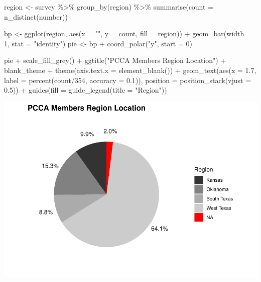 \documentclass[
]{article}
\newenvironment{Shaded}{\begin{snugshade}}{\end{snugshade}}
\newcommand{\AttributeTok}[1]{\textcolor[rgb]{0.77,0.63,0.00}{#1}}
\newcommand{\DecValTok}[1]{\textcolor[rgb]{0.00,0.00,0.81}{#1}}
\newcommand{\FloatTok}[1]{\textcolor[rgb]{0.00,0.00,0.81}{#1}}
\newcommand{\FunctionTok}[1]{\textcolor[rgb]{0.00,0.00,0.00}{#1}}
\newcommand{\NormalTok}[1]{#1}
\newcommand{\OtherTok}[1]{\textcolor[rgb]{0.56,0.35,0.01}{#1}}
\newcommand{\SpecialCharTok}[1]{\textcolor[rgb]{0.00,0.00,0.00}{#1}}
\newcommand{\StringTok}[1]{\textcolor[rgb]{0.31,0.60,0.02}{#1}}
\begin{document}
\begin{Shaded}
\begin{Highlighting}[]
\NormalTok{region }\OtherTok{\textless{}{-}}\NormalTok{ survey }\SpecialCharTok{\%\textgreater{}\%}
    \FunctionTok{group\_by}\NormalTok{(region) }\SpecialCharTok{\%\textgreater{}\%}
    \FunctionTok{summarise}\NormalTok{(}\AttributeTok{count =} \FunctionTok{n\_distinct}\NormalTok{(number))}

\NormalTok{bp }\OtherTok{\textless{}{-}} \FunctionTok{ggplot}\NormalTok{(region, }\FunctionTok{aes}\NormalTok{(}\AttributeTok{x =} \StringTok{""}\NormalTok{, }\AttributeTok{y =}\NormalTok{ count, }\AttributeTok{fill =}\NormalTok{ region)) }\SpecialCharTok{+}
    \FunctionTok{geom\_bar}\NormalTok{(}\AttributeTok{width =} \DecValTok{1}\NormalTok{, }\AttributeTok{stat =} \StringTok{"identity"}\NormalTok{)}
\NormalTok{pie }\OtherTok{\textless{}{-}}\NormalTok{ bp }\SpecialCharTok{+} \FunctionTok{coord\_polar}\NormalTok{(}\StringTok{"y"}\NormalTok{, }\AttributeTok{start =} \DecValTok{0}\NormalTok{)}

\NormalTok{pie }\SpecialCharTok{+} \FunctionTok{scale\_fill\_grey}\NormalTok{() }\SpecialCharTok{+} \FunctionTok{ggtitle}\NormalTok{(}\StringTok{"PCCA Members Region Location"}\NormalTok{) }\SpecialCharTok{+}
\NormalTok{    blank\_theme }\SpecialCharTok{+} \FunctionTok{theme}\NormalTok{(}\AttributeTok{axis.text.x =} \FunctionTok{element\_blank}\NormalTok{()) }\SpecialCharTok{+} \FunctionTok{geom\_text}\NormalTok{(}\FunctionTok{aes}\NormalTok{(}\AttributeTok{x =} \FloatTok{1.7}\NormalTok{,}
    \AttributeTok{label =} \FunctionTok{percent}\NormalTok{(count}\SpecialCharTok{/}\DecValTok{354}\NormalTok{, }\AttributeTok{accuracy =} \FloatTok{0.1}\NormalTok{)), }\AttributeTok{position =} \FunctionTok{position\_stack}\NormalTok{(}\AttributeTok{vjust =} \FloatTok{0.5}\NormalTok{)) }\SpecialCharTok{+}
    \FunctionTok{guides}\NormalTok{(}\AttributeTok{fill =} \FunctionTok{guide\_legend}\NormalTok{(}\AttributeTok{title =} \StringTok{"Region"}\NormalTok{))}
\end{Highlighting}
\end{Shaded}

\includegraphics{pcca_survey_files/figure-latex/region-all-1.pdf}
\end{document}
